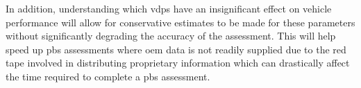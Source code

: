 In addition, understanding which \glspl{vdp} have an insignificant effect on vehicle performance will allow for conservative estimates to be made for these parameters without significantly degrading the accuracy of the assessment. This will help speed up \gls{pbs} assessments where \gls{oem} data is not readily supplied due to the red tape involved in distributing proprietary information which can drastically affect the time required to complete a \gls{pbs} assessment.



